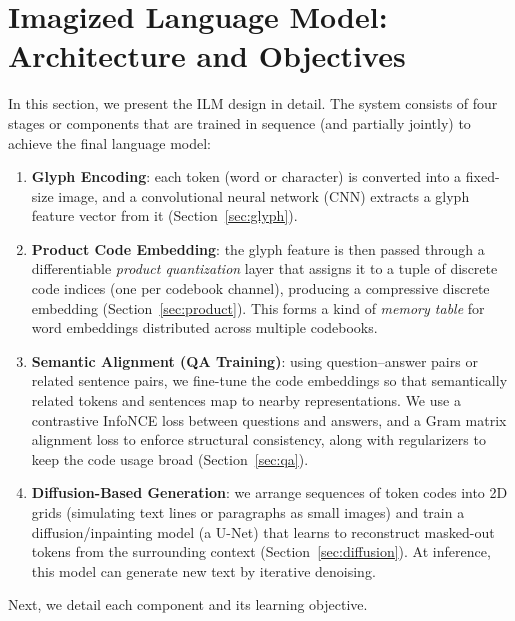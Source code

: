 \documentclass[10pt,twocolumn]{article}
\begin{document}
\section{Imagized Language Model: Architecture and Objectives}
In this section, we present the ILM design in detail. The system consists of four stages or components that are trained in sequence (and partially jointly) to achieve the final language model:
\begin{enumerate}
    \item \textbf{Glyph Encoding}: each token (word or character) is converted into a fixed-size image, and a convolutional neural network (CNN) extracts a glyph feature vector from it (Section~\ref{sec:glyph}).
    \item \textbf{Product Code Embedding}: the glyph feature is then passed through a differentiable \emph{product quantization} layer that assigns it to a tuple of discrete code indices (one per codebook channel), producing a compressive discrete embedding (Section~\ref{sec:product}). This forms a kind of \emph{memory table} for word embeddings distributed across multiple codebooks.
    \item \textbf{Semantic Alignment (QA Training)}: using question--answer pairs or related sentence pairs, we fine-tune the code embeddings so that semantically related tokens and sentences map to nearby representations. We use a contrastive InfoNCE loss between questions and answers, and a Gram matrix alignment loss to enforce structural consistency, along with regularizers to keep the code usage broad (Section~\ref{sec:qa}).
    \item \textbf{Diffusion-Based Generation}: we arrange sequences of token codes into 2D grids (simulating text lines or paragraphs as small images) and train a diffusion/inpainting model (a U-Net) that learns to reconstruct masked-out tokens from the surrounding context (Section~\ref{sec:diffusion}). At inference, this model can generate new text by iterative denoising.
\end{enumerate}

Next, we detail each component and its learning objective.
\end{document}
